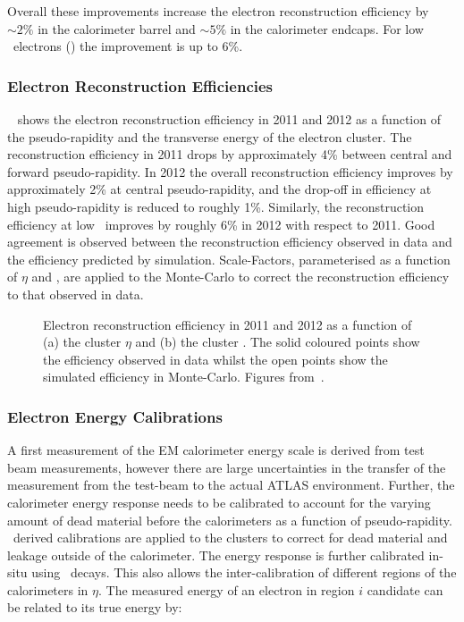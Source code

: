 Overall these improvements increase the electron reconstruction efficiency by
$\sim2\%$ in the calorimeter barrel and $\sim5\%$ in the calorimeter endcaps.
For low \et\ electrons () the improvement is up to 6\%.

\subsubsection{Electron Reconstruction Efficiencies}

~ shows the electron reconstruction efficiency in 2011 and 2012
as a function of the pseudo-rapidity and the transverse energy of the electron cluster.
The reconstruction efficiency in 2011 drops by approximately 4\% between central
and forward pseudo-rapidity. In 2012 the overall reconstruction efficiency
improves by approximately 2\% at central pseudo-rapidity, and the drop-off in
efficiency at high pseudo-rapidity is reduced to roughly 1\%. Similarly, the
reconstruction efficiency at low \et\ improves by roughly 6\% in 2012 with
respect to 2011. Good agreement is observed between the reconstruction
efficiency observed in data and the efficiency predicted by simulation.
Scale-Factors, parameterised as a function of $\eta$ and \et, are applied to
the Monte-Carlo to correct the reconstruction efficiency to that observed in
data.

\begin{figure}[h]
\centering
\caption[Electron reconstruction efficiency in 2011 and 2012 as a function of the cluster
$\eta$ and the cluster \et. ]{Electron reconstruction efficiency in 2011 and 2012 as a function of (a) the cluster
$\eta$ and (b) the cluster \et. The solid coloured points show the efficiency
observed in data whilst the open points show the simulated efficiency in
Monte-Carlo. Figures from~\cite{ElectronEfficiency2012}.}
\label{fig:el-reco-eff}
\end{figure}

\subsubsection{Electron Energy Calibrations}

A first measurement of the EM calorimeter energy scale is derived from test beam
measurements, however there are large uncertainties in the transfer
of the measurement from the test-beam to the actual ATLAS environment. Further,
the calorimeter energy response needs to be calibrated to account for the
varying amount of dead material before the calorimeters as a function of
pseudo-rapidity. \mc\ derived calibrations are applied
to the clusters to correct for dead material and leakage outside of the
calorimeter. The energy response is further calibrated in-situ using \Zee\
decays. This also allows the inter-calibration of different regions of the
calorimeters in $\eta$. The measured energy of an electron in region $i$ candidate can be
related to its true energy by:

